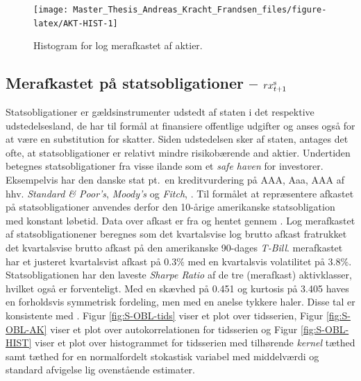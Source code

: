 \documentclass[
  a4paper,
  oneside]{memoir}
\begin{document}
\begin{figure}[H]

{\centering \texttt{[image: Master\_Thesis\_Andreas\_Kracht\_Frandsen\_files/figure-latex/AKT-HIST-1]} 

}

\caption{Histogram for log merafkastet af aktier.}\label{fig:AKT-HIST}
\end{figure}

\hypertarget{merafkastet-puxe5-statsobligationer-rx_t1textnormals}{%
\subsection{\texorpdfstring{Merafkastet på statsobligationer -- \(rx_{t+1}^{\textnormal{s}}\)}{Merafkastet på statsobligationer -- rx\_\{t+1\}\^{}\{\textbackslash textnormal\{s\}\}}}\label{merafkastet-puxe5-statsobligationer-rx_t1textnormals}}

Statsobligationer er gældsinstrumenter udstedt af staten i det respektive udstedelsesland, de har til formål at finansiere offentlige udgifter og anses også for at være en substitution for skatter. Siden udstedelsen sker af staten, antages det ofte, at statsobligationer er relativt mindre risikobærende and aktier. Undertiden betegnes statsobligationer fra visse ilande som et \emph{safe haven} for investorer. Eksempelvis har den danske stat pt.~en kreditvurdering på AAA, Aaa, AAA af hhv. \emph{Standard \& Poor's}, \emph{Moody's} og \emph{Fitch}, \citep{TradingEconomics2020}. Til formålet at repræsentere afkastet på statsobligationer anvendes derfor den 10-årige amerikanske statsobligation med konstant løbetid. Data over afkast er fra \citep{CRSPt90} og hentet gennem \citep{WRDSt90}. Log merafkastet af statsobligationener beregnes som det kvartalsvise log brutto afkast fratrukket det kvartalsvise brutto afkast på den amerikanske 90-dages \emph{T-Bill}. merafkastet har et justeret kvartalsvist afkast på 0.3\(\%\) med en kvartalsvis volatilitet på 3.8\(\%\). Statsobligationen har den laveste \emph{Sharpe Ratio} af de tre (merafkast) aktivklasser, hvilket også er forventeligt. Med en skævhed på 0.451 og kurtosis på 3.405 haves en forholdsvis symmetrisk fordeling, men med en anelse tykkere haler. Disse tal er konsistente med \citep{CampVic2003}. Figur \ref{fig:S-OBL-tids} viser et plot over tidsserien, Figur \ref{fig:S-OBL-AK} viser et plot over autokorrelationen for tidsserien og Figur \ref{fig:S-OBL-HIST} viser et plot over histogrammet for tidsserien med tilhørende \emph{kernel} tæthed samt tæthed for en normalfordelt stokastisk variabel med middelværdi og standard afvigelse lig ovenstående estimater.
\end{document}
